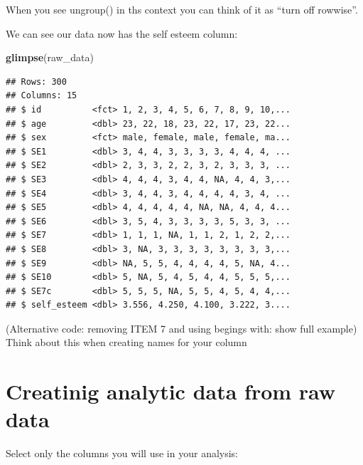 \documentclass[
]{krantz}
\makeatletter
\newenvironment{Shaded}{\begin{snugshade}}{\end{snugshade}}
\newcommand{\KeywordTok}[1]{\textcolor[rgb]{0.27,0.27,0.27}{\textbf{#1}}}
\newcommand{\NormalTok}[1]{#1}
\newcommand{\OperatorTok}[1]{\textcolor[rgb]{0.43,0.43,0.43}{\textbf{#1}}}
\newcommand{\StringTok}[1]{\textcolor[rgb]{0.5,0.5,0.5}{#1}}
\newenvironment{kframe}{%
\medskip{}
\setlength{\fboxsep}{.8em}
 \def\at@end@of@kframe{}%
 \ifinner\ifhmode%
  \def\at@end@of@kframe{\end{minipage}}%
  \begin{minipage}{\columnwidth}%
 \fi\fi%
 \def\FrameCommand##1{\hskip\@totalleftmargin \hskip-\fboxsep
 \colorbox{shadecolor}{##1}\hskip-\fboxsep
     \hskip-\linewidth \hskip-\@totalleftmargin \hskip\columnwidth}%
 \MakeFramed {\advance\hsize-\width
   \@totalleftmargin\z@ \linewidth\hsize
   \@setminipage}}%
 {\par\unskip\endMakeFramed%
 \at@end@of@kframe}
\renewenvironment{Shaded}{\begin{kframe}}{\end{kframe}}
\makeatother
\begin{document}
When you see ungroup() in ths context you can think of it as ``turn off rowwise''.

We can see our data now has the self esteem column:

\begin{Shaded}
\begin{Highlighting}[]
\KeywordTok{glimpse}\NormalTok{(raw_data)}
\end{Highlighting}
\end{Shaded}

\begin{verbatim}
## Rows: 300
## Columns: 15
## $ id          <fct> 1, 2, 3, 4, 5, 6, 7, 8, 9, 10,...
## $ age         <dbl> 23, 22, 18, 23, 22, 17, 23, 22...
## $ sex         <fct> male, female, male, female, ma...
## $ SE1         <dbl> 3, 4, 4, 3, 3, 3, 3, 4, 4, 4, ...
## $ SE2         <dbl> 2, 3, 3, 2, 2, 3, 2, 3, 3, 3, ...
## $ SE3         <dbl> 4, 4, 4, 3, 4, 4, NA, 4, 4, 3,...
## $ SE4         <dbl> 3, 4, 4, 3, 4, 4, 4, 4, 3, 4, ...
## $ SE5         <dbl> 4, 4, 4, 4, 4, NA, NA, 4, 4, 4...
## $ SE6         <dbl> 3, 5, 4, 3, 3, 3, 3, 5, 3, 3, ...
## $ SE7         <dbl> 1, 1, 1, NA, 1, 1, 2, 1, 2, 2,...
## $ SE8         <dbl> 3, NA, 3, 3, 3, 3, 3, 3, 3, 3,...
## $ SE9         <dbl> NA, 5, 5, 4, 4, 4, 4, 5, NA, 4...
## $ SE10        <dbl> 5, NA, 5, 4, 5, 4, 4, 5, 5, 5,...
## $ SE7c        <dbl> 5, 5, 5, NA, 5, 5, 4, 5, 4, 4,...
## $ self_esteem <dbl> 3.556, 4.250, 4.100, 3.222, 3....
\end{verbatim}

(Alternative code: removing ITEM 7 and using begings with: show full example)
Think about this when creating names for your column

\hypertarget{creatinig-analytic-data-from-raw-data}{%
\section{Creatinig analytic data from raw data}\label{creatinig-analytic-data-from-raw-data}}

Select only the columns you will use in your analysis:

\begin{Shaded}
\end{Shaded}
\end{document}
